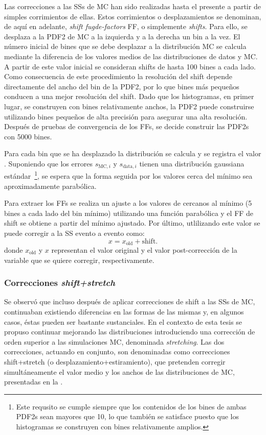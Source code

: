 Las correcciones a las \acp{SS} de \ac{MC} han sido realizadas hasta el presente a partir de simples corrimientos de ellas. Estos corrimientos o desplazamientos se denominan, de aquí en adelante, \textit{shift fugde-factors} \ac{FF}, o simplemente \textit{shifts}.
Para ello, se desplaza a la \ac{PDF2} de \ac{MC} a la izquierda y a la derecha un bin a la vez.
El número inicial de bines que se debe desplazar a la distribución \ac{MC} se calcula mediante la diferencia de los valores medios de las distribuciones de datos y \ac{MC}. A partir de este valor inicial se consideran shifts de hasta 100 bines a cada lado.
Como consecuencia de este procedimiento la resolución del shift depende directamente del ancho del bin de la \ac{PDF2}, por lo que bines más pequeños conducen a una mejor resolución del shift. Dado que los histogramas, en primer lugar, se construyen con bines relativamente anchos, la \ac{PDF2} puede construirse utilizando bines pequeños de alta precisión para asegurar una alta resolución. Después de pruebas de convergencia de los \acp{FF}, se decide construir las \acp{PDF2} con 5000 bines.

Para cada bin que se ha desplazado la distribución se calcula y se registra el valor \chisq. Suponiendo que los errores \(s_{\text{MC},i}\) y \(s_{\text{data},i}\) tienen una distribución gaussiana estándar~\footnote{Este requsito se cumple siempre que los contenidos de los bines de ambas \acp{PDF2} sean mayores que 10, lo que también se satisface puesto que los histogramas se construyen con bines relativamente amplios.}, se espera que la forma seguida por los valores \chisq cerca del mínimo sea aproximadamente parabólica.

Para extraer los \acp{FF} se realiza un ajuste a los valores de \chisq cercanos al mínimo (5 bines a cada lado del bin mínimo) utilizando una función parabólica y el \ac{FF} de shift se obtiene a partir del mínimo ajustado. Por último, utlilizando este valor se puede corregir a la \ac{SS} evento a evento como:
\[
	x = x_{\text{old}} + \text{shift}.
\]
donde \(x_{\text{old}}\) y \(x\) representan el valor original y el valor post-corrección de la variable que se quiere corregir, respectivamente.


\subsubsection{Correcciones \textit{shift+stretch}}

Se observó que incluso después de aplicar correcciones de shift a las \acp{SS} de \ac{MC}, continuaban existiendo diferencias en las formas de las mismas y, en algunos casos, éstas pueden ser bastante sustanciales. 
En el contexto de esta tesis se propuso continuar mejorando las distribuciones introduciendo una corrección de orden superior a las simulaciones \ac{MC}, denominada \textit{stretching}. Las dos correcciones, actuando en conjunto, son denominadas como correcciones shift+stretch (o desplazamiento+estiramiento), que pretenden corregir simultáneamente el valor medio y los anchos de las distribuciones de \ac{MC}, presentadas en la .

